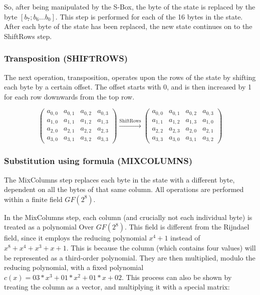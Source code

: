 \documentclass[12pt]{report}
\theoremstyle{definition}
\theoremstyle{remark}
\begin{document}
So, after being manipulated by the S-Box, the byte of the state is replaced by the byte $[b_7; b_6 ... b_0 ]$. This step is performed for each of the 16 bytes in the state. After each byte of the state has been replaced, the new state continues on to the ShiftRows step.

\subsubsection{Transposition (SHIFTROWS)}
The next operation, transposition, operates upon the rows of the state by shifting each byte by a certain offset. The offset starts with 0, and is then increased by 1 for each row downwards from the top row.

\[ \left( \begin{array}{cccc}
a_{0,0} & a_{0,1} & a_{0,2} & a_{0,3} \\
a_{1,0} & a_{1,1} & a_{1,2} & a_{1,3} \\
a_{2,0} & a_{2,1} & a_{2,2} & a_{2,3} \\
a_{3,0} & a_{3,1} & a_{3,2} & a_{3,3}\end{array} \right)
\xrightarrow{\text{ShiftRows}}
\left( \begin{array}{cccc}
a_{0,0} & a_{0,1} & a_{0,2} & a_{0,3} \\
a_{1,1} & a_{1,2} & a_{1,3} & a_{1,0} \\
a_{2,2} & a_{2,3} & a_{2,0} & a_{2,1} \\
a_{3,3} & a_{3,0} & a_{3,1} & a_{3,2}\end{array} \right)
\]

\subsubsection{Substitution using formula (MIXCOLUMNS)}
The MixColumns step replaces each byte in the state with a different byte, dependent on all the bytes of that same column. All operations are performed within a finite field $GF(2^8)$.

In the MixColumns step, each column (and crucially not each individual byte) is treated as a polynomial Over $GF(2^8)$. This field is different from the Rijndael field, since it employs the reducing polynomial $x^4+1$ instead of $x^8+x^4+x^3+x+1$. This is because the column (which contains four values) will be represented as a third-order polynomial\cite{Rijndael}.
They are then multiplied, modulo the reducing polynomial, with a fixed polynomial $c(x)=03*x^3+01*x^2+01*x+02$. This process can also be shown by treating the column as a vector, and multiplying it with a special matrix:
\end{document}
